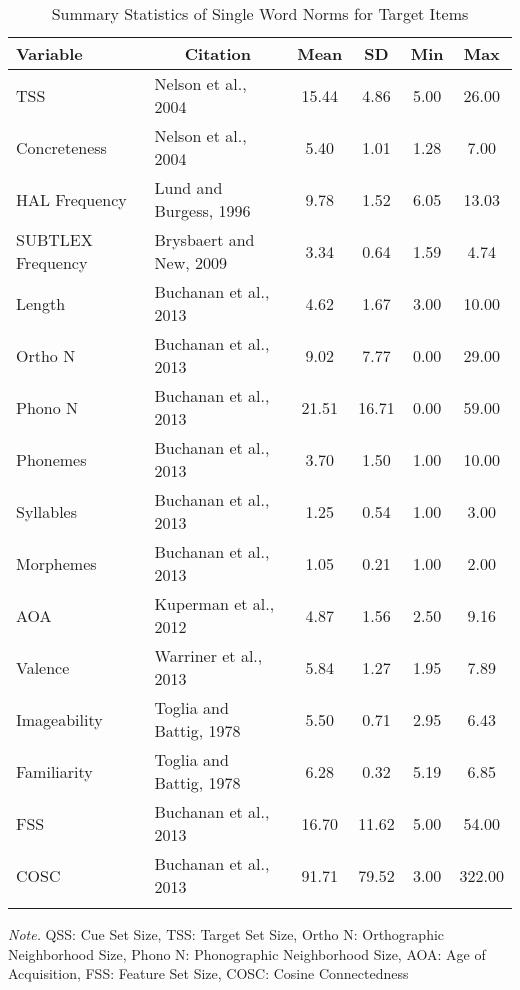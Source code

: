 \documentclass[english,man]{apa6}
\theoremstyle{definition}
\theoremstyle{definition}
\theoremstyle{definition}
\theoremstyle{remark}
\begin{document}
\begin{table}[tbp]
\begin{center}
\begin{threeparttable}
\caption{\label{tab:stim-table-target}Summary Statistics of Single Word Norms for Target Items}
\begin{tabular}{llcccc}
\toprule
Variable & \multicolumn{1}{c}{Citation} & \multicolumn{1}{c}{Mean} & \multicolumn{1}{c}{SD} & \multicolumn{1}{c}{Min} & \multicolumn{1}{c}{Max}\\
\midrule
TSS & Nelson et al., 2004 & 15.44 & 4.86 & 5.00 & 26.00\\
Concreteness & Nelson et al., 2004 & 5.40 & 1.01 & 1.28 & 7.00\\
HAL Frequency & Lund and Burgess, 1996 & 9.78 & 1.52 & 6.05 & 13.03\\
SUBTLEX Frequency & Brysbaert and New, 2009 & 3.34 & 0.64 & 1.59 & 4.74\\
Length & Buchanan et al., 2013 & 4.62 & 1.67 & 3.00 & 10.00\\
Ortho N & Buchanan et al., 2013 & 9.02 & 7.77 & 0.00 & 29.00\\
Phono N & Buchanan et al., 2013 & 21.51 & 16.71 & 0.00 & 59.00\\
Phonemes & Buchanan et al., 2013 & 3.70 & 1.50 & 1.00 & 10.00\\
Syllables & Buchanan et al., 2013 & 1.25 & 0.54 & 1.00 & 3.00\\
Morphemes & Buchanan et al., 2013 & 1.05 & 0.21 & 1.00 & 2.00\\
AOA & Kuperman et al., 2012 & 4.87 & 1.56 & 2.50 & 9.16\\
Valence & Warriner et al., 2013 & 5.84 & 1.27 & 1.95 & 7.89\\
Imageability & Toglia and Battig, 1978 & 5.50 & 0.71 & 2.95 & 6.43\\
Familiarity & Toglia and Battig, 1978 & 6.28 & 0.32 & 5.19 & 6.85\\
FSS & Buchanan et al., 2013 & 16.70 & 11.62 & 5.00 & 54.00\\
COSC & Buchanan et al., 2013 & 91.71 & 79.52 & 3.00 & 322.00\\
\bottomrule
\addlinespace
\end{tabular}
\begin{tablenotes}[para]
\textit{Note.} QSS: Cue Set Size, TSS: Target Set Size, Ortho N: Orthographic Neighborhood Size, Phono N: Phonographic Neighborhood Size, AOA: Age of Acquisition, FSS: Feature Set Size, COSC: Cosine Connectedness
\end{tablenotes}
\end{threeparttable}
\end{center}
\end{table}
\end{document}

